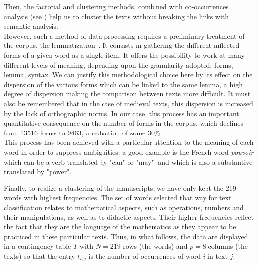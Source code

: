 \documentclass[preprint]{elsarticle}
\begin{document}
Then, the factorial and clustering methods, combined with co-occurrences analysis (see \cite{martinezcontribution2003}) help us to cluster the texts without breaking the links with semantic analysis.\\

However, such a method of data processing requires a preliminary treatment of the corpus, the lemmatization~\cite{brunet2000}. It consists in gathering the different inflected forms of a given word as a single item. It offers the possibility to work at many different levels of meaning, depending upon the granularity adopted: forms, lemma, syntax. We can justify this methodological choice here by its effect on the dispersion of the various forms which can be linked to the same lemma, a high degree of dispersion making the comparison between texts more difficult. It must also be remembered that in the case of medieval texts, this dispersion is increased by the lack of orthographic norms. In our case, this process has an important quantitative consequence on the number of forms in the corpus, which declines from 13516 forms to 9463, a reduction of some 30\%.\\


This process has been achieved with a particular attention to the meaning of each word in order to suppress ambiguities: a good example is the French word \textit{pouvoir} which can be a verb translated by "can" or "may", and which is also a substantive translated by "power".

Finally, to realize a clustering of the manuscripts, we have only kept the 219 words with highest frequencies. The set of words selected that way for text classification relates to mathematical aspects, such as operations, numbers and their manipulations, as well as to didactic aspects. Their higher frequencies reflect the fact that they are the language of the mathematics as they appear to be practiced in these particular texts. Thus, in what follows, the data are displayed in a contingency table $T$ with $N=219$ rows (the words) and $p=8$ columns (the texts) so that the entry $t_{i,j}$ is the number of occurrences of word $i$ in text $j$.
\end{document}
